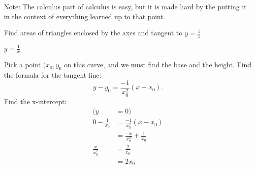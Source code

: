 \documentclass[a4paper,11pt,twoside]{report}
\begin{document}
Note: The calculus part of calculus is easy, but it is made hard by the putting it in the
context of everything learned up to that point.

\begin{example}
	Find areas of triangles enclosed by the axes and tangent to $y = \frac{1}{x}$
\end{example}
\begin{solution}
	$y = \frac{1}{x}$

	Pick a point $(x_0,y_0$ on this curve, and we must find the base and the height. Find the
	formula for the tangent line:\[
		y - y_0 = \frac{-1}{x_0^2}(x-x_0)
	.\]
	Find the x-intercept:
	\begin{align*}
		(y&= 0) \\
		0- \frac{1}{x_0}&= \frac{-1}{x_0^2}(x-x_0) \\
		&= \frac{-x}{x_0^2} + \frac{1}{x_0} \\
		\frac{x}{x_0^2} &= \frac{2}{x_0} \\
		&= 2x_0
	\end{align*}
\end{solution}


\newpage
\end{document}

